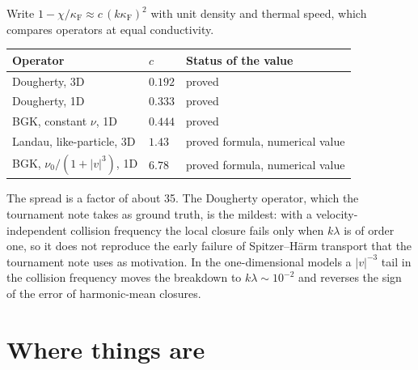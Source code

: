 \documentclass[11pt]{article}
\begin{document}
Write $1-\chi/\kappa_{\mathrm F}\approx c\,(k\kappa_{\mathrm F})^2$ with unit
density and thermal speed, which compares operators at equal conductivity.
\begin{center}
\renewcommand{\arraystretch}{1.25}
\begin{tabular}{lll}
  Operator & $c$ & Status of the value \\ \hline
  Dougherty, 3D & $0.192$ & proved \\
  Dougherty, 1D & $0.333$ & proved \\
  BGK, constant $\nu$, 1D & $0.444$ & proved \\
  Landau, like-particle, 3D & $1.43$ & proved formula, numerical value \\
  BGK, $\nu_0/(1+|v|^3)$, 1D & $6.78$ & proved formula, numerical value \\
\end{tabular}
\end{center}
The spread is a factor of about 35. The Dougherty operator, which the
tournament note takes as ground truth, is the mildest: with a
velocity-independent collision frequency the local closure fails only when
$k\lambda$ is of order one, so it does not reproduce the early failure of
Spitzer--H\"arm transport that the tournament note uses as motivation. In the
one-dimensional models a $|v|^{-3}$ tail in the collision frequency moves the
breakdown to $k\lambda\sim10^{-2}$ and reverses the sign of the error of
harmonic-mean closures.

\section{Where things are}
\end{document}
